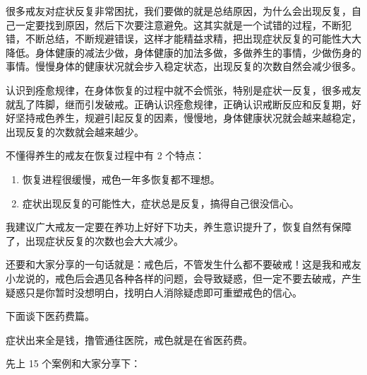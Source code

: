 \documentclass{ctexart}
\begin{document}
很多戒友对症状反复非常困扰，我们要做的就是总结原因，为什么会出现反复，自己一定要找到原因，然后下次要注意避免。这其实就是一个试错的过程，不断犯错，不断总结，不断规避错误，这样才能精益求精，把出现症状反复的可能性大大降低。身体健康的减法少做，身体健康的加法多做，多做养生的事情，少做伤身的事情。慢慢身体的健康状况就会步入稳定状态，出现反复的次数自然会减少很多。

认识到痊愈规律，在身体恢复的过程中就不会慌张，特别是症状一反复，很多戒友就乱了阵脚，继而引发破戒。正确认识痊愈规律，正确认识戒断反应和反复期，好好坚持戒色养生，规避引起反复的因素，慢慢地，身体健康状况就会越来越稳定，出现反复的次数就会越来越少。

不懂得养生的戒友在恢复过程中有 2 个特点：

\begin{enumerate}
    \item 恢复进程很缓慢，戒色一年多恢复都不理想。
    \item 症状出现反复的可能性大，症状总是反复，搞得自己很没信心。
\end{enumerate}

我建议广大戒友一定要在养功上好好下功夫，养生意识提升了，恢复自然有保障了，出现症状反复的次数也会大大减少。

还要和大家分享的一句话就是：戒色后，不管发生什么都不要破戒！这是我和戒友小龙说的，戒色后会遇见各种各样的问题，会导致疑惑，但一定不要去破戒，产生疑惑只是你暂时没想明白，找明白人消除疑虑即可重塑戒色的信心。

下面谈下医药费篇。

症状出来全是钱，撸管通往医院，戒色就是在省医药费。

先上 15 个案例和大家分享下：
\end{document}
